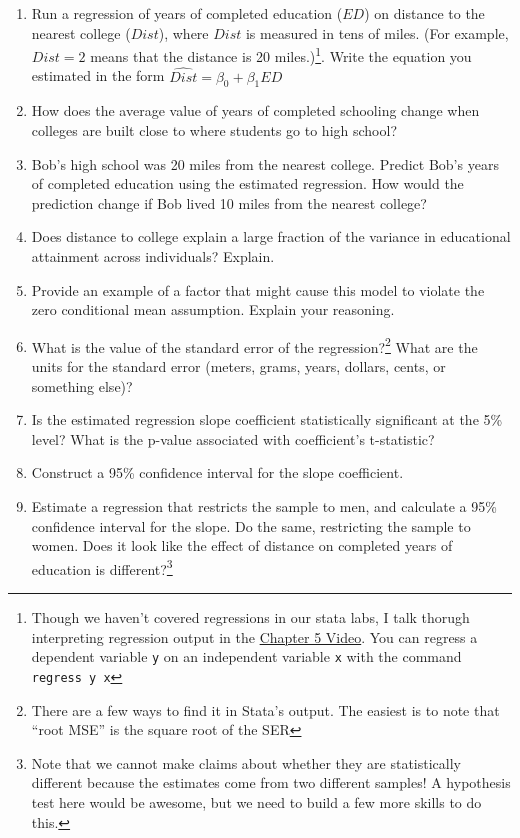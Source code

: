 \documentclass[
]{article}
\begin{document}
\begin{enumerate}
\begin{enumerate}
\def\labelenumi{\alph{enumi}.}
\item
  Run a regression of years of completed education (\(ED\)) on distance
  to the nearest college (\(Dist\)), where \(Dist\) is measured in tens
  of miles. (For example, \(Dist=2\) means that the distance is 20
  miles.)\footnote{Though we haven't covered regressions in our stata
    labs, I talk thorugh interpreting regression output in the
    \href{https://youtu.be/DZo5m5q3bmA}{Chapter 5 Video}. You can
    regress a dependent variable \texttt{y} on an independent variable
    \texttt{x} with the command \texttt{regress\ y\ x}}. Write the
  equation you estimated in the form
  \(\widehat{Dist} = \beta_0 + \beta_1 ED\)
\item
  How does the average value of years of completed schooling change when
  colleges are built close to where students go to high school?
\item
  Bob's high school was 20 miles from the nearest college. Predict Bob's
  years of completed education using the estimated regression. How would
  the prediction change if Bob lived 10 miles from the nearest college?
\item
  Does distance to college explain a large fraction of the variance in
  educational attainment across individuals? Explain.
\item
  Provide an example of a factor that might cause this model to violate
  the zero conditional mean assumption. Explain your reasoning.
\item
  What is the value of the standard error of the regression?\footnote{There
    are a few ways to find it in Stata's output. The easiest is to note
    that ``root MSE'' is the square root of the SER} What are the units
  for the standard error (meters, grams, years, dollars, cents, or
  something else)?
\item
  Is the estimated regression slope coefficient statistically
  significant at the 5\% level? What is the p-value associated with
  coefficient's t-statistic?
\item
  Construct a 95\% confidence interval for the slope coefficient.
\item
  Estimate a regression that restricts the sample to men, and calculate
  a 95\% confidence interval for the slope. Do the same, restricting the
  sample to women. Does it look like the effect of distance on completed
  years of education is different?\footnote{Note that we cannot make
    claims about whether they are statistically different because the
    estimates come from two different samples! A hypothesis test here
    would be awesome, but we need to build a few more skills to do this.}
\end{enumerate}
\end{enumerate}
\end{document}
